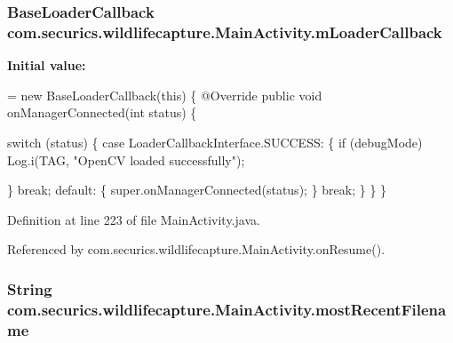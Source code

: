 \subsubsection[{m\+Loader\+Callback}]{\setlength{\rightskip}{0pt plus 5cm}Base\+Loader\+Callback com.\+securics.\+wildlifecapture.\+Main\+Activity.\+m\+Loader\+Callback\hspace{0.3cm}{\ttfamily [private]}}\label{classcom_1_1securics_1_1wildlifecapture_1_1_main_activity_a245966455a5f379f46a69e91bea74b9b}
{\bfseries Initial value\+:}
\begin{DoxyCode}
= \textcolor{keyword}{new} BaseLoaderCallback(\textcolor{keyword}{this}) \{
        @Override
        \textcolor{keyword}{public} \textcolor{keywordtype}{void} onManagerConnected(\textcolor{keywordtype}{int} status) \{

            \textcolor{keywordflow}{switch} (status) \{
            \textcolor{keywordflow}{case} LoaderCallbackInterface.SUCCESS: \{
                \textcolor{keywordflow}{if} (debugMode)
                    Log.i(TAG, \textcolor{stringliteral}{"OpenCV loaded successfully"});

            \}
                \textcolor{keywordflow}{break};
            \textcolor{keywordflow}{default}: \{
                super.onManagerConnected(status);
            \}
                \textcolor{keywordflow}{break};
            \}
        \}
    \}
\end{DoxyCode}


Definition at line 223 of file Main\+Activity.\+java.



Referenced by com.\+securics.\+wildlifecapture.\+Main\+Activity.\+on\+Resume().

\subsubsection[{most\+Recent\+Filename}]{\setlength{\rightskip}{0pt plus 5cm}String com.\+securics.\+wildlifecapture.\+Main\+Activity.\+most\+Recent\+Filename\hspace{0.3cm}{\ttfamily [private]}}\label{classcom_1_1securics_1_1wildlifecapture_1_1_main_activity_a351c05af34c6f259b2bad9efa332ef54}


